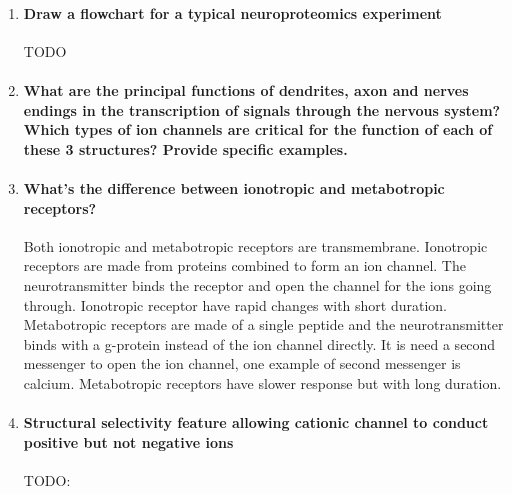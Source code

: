 \documentclass[12pt,article,oneside,a4paper]{memoir}
\begin{document}
\begin{enumerate}
\item \paragraph{Draw a flowchart for a typical neuroproteomics experiment}
TODO

\item \paragraph{What are the principal functions of dendrites, axon and nerves endings in the transcription of signals through the nervous system? Which types of ion channels are critical for the function of each of these 3 structures? Provide specific examples.}

\item \paragraph{What’s the difference between ionotropic and metabotropic receptors?} Both ionotropic and metabotropic receptors are transmembrane. Ionotropic receptors are made from proteins combined to form an ion channel. The neurotransmitter binds the receptor and open the channel for the ions going through. Ionotropic receptor have rapid changes with short duration. Metabotropic receptors are made of a single peptide and the neurotransmitter binds with a g-protein instead of the ion channel directly. It is need a second messenger to open the ion channel, one example of second messenger is calcium. Metabotropic receptors have slower response but with long duration.

\item \paragraph{Structural selectivity feature allowing cationic channel to conduct positive but not negative ions}
TODO:

\end{enumerate}

\end{document}
